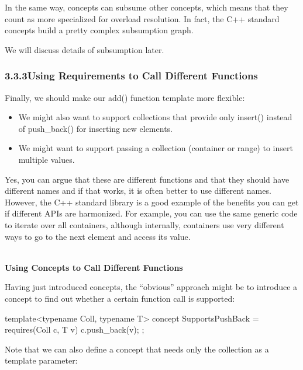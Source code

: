 In the same way, concepts can subsume other concepts, which means that they count as more specialized for overload resolution. In fact, the C++ standard concepts build a pretty complex subsumption graph.

We will discuss details of subsumption later.

\subsubsection*{ 3.3.3\hspace{0.2cm}Using Requirements to Call Different Functions}

Finally, we should make our add() function template more flexible:

\begin{itemize}
\item
We might also want to support collections that provide only insert() instead of push\_back() for inserting new elements.

\item
We might want to support passing a collection (container or range) to insert multiple values.
\end{itemize}

Yes, you can argue that these are different functions and that they should have different names and if that works, it is often better to use different names. However, the C++ standard library is a good example of the benefits you can get if different APIs are harmonized. For example, you can use the same generic code to iterate over all containers, although internally, containers use very different ways to go to the next element and access its value.

\noindent
\hspace*{\fill} \\ %
\textbf{Using Concepts to Call Different Functions}

Having just introduced concepts, the “obvious” approach might be to introduce a concept to find out whether a certain function call is supported:

\begin{cpp}
template<typename Coll, typename T>
concept SupportsPushBack = requires(Coll c, T v) {
	c.push_back(v);
};
\end{cpp}

Note that we can also define a concept that needs only the collection as a template parameter:

